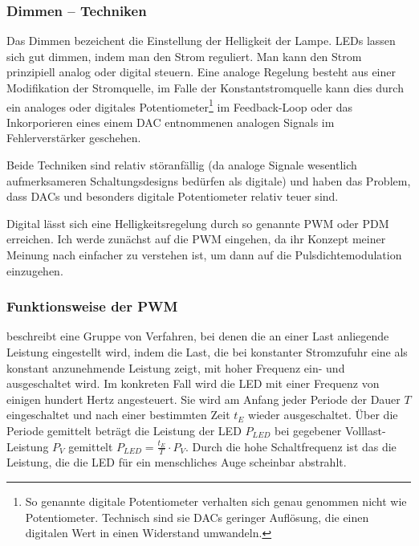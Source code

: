 \documentclass[12pt,a4paper,notitlepage]{article}
\begin{document}
\subsubsection{Dimmen -- Techniken}
Das Dimmen bezeichent die Einstellung der Helligkeit der Lampe. \glspl{LED} lassen sich gut dimmen, indem man den Strom reguliert. Man kann den Strom prinzipiell analog oder digital steuern. Eine analoge Regelung besteht aus einer Modifikation der Stromquelle, im Falle der Konstantstromquelle kann dies durch ein analoges oder digitales Potentiometer\footnote{So genannte digitale Potentiometer verhalten sich genau genommen nicht wie Potentiometer. Technisch sind sie \glspl{DAC} geringer Auflösung, die einen digitalen Wert in einen Widerstand umwandeln.} im Feedback-Loop oder das Inkorporieren eines einem \gls{DAC} entnommenen analogen Signals im Fehlerverstärker geschehen\cite{MAXIM23,MAXIM41,MAXIM42,ANALOG4,ANALOG5}.

Beide Techniken sind relativ störanfällig (da analoge Signale wesentlich aufmerksameren Schaltungsdesigns bedürfen als digitale) und haben das Problem, dass \glspl{DAC} und besonders digitale Potentiometer relativ teuer sind.

Digital lässt sich eine Helligkeitsregelung durch so genannte \gls{PWM} oder \gls{PDM} erreichen. Ich werde zunächst auf die \gls{PWM} eingehen, da ihr Konzept meiner Meinung nach einfacher zu verstehen ist, um dann auf die Pulsdichtemodulation einzugehen.

\subsubsection{Funktionsweise der PWM}
 beschreibt eine Gruppe von Verfahren, bei denen die an einer Last anliegende Leistung eingestellt wird, indem die Last, die bei konstanter Stromzufuhr eine als konstant anzunehmende Leistung zeigt, mit hoher Frequenz ein- und ausgeschaltet wird. Im konkreten Fall wird die \gls{LED} mit einer Frequenz von einigen hundert \gls{Hertz} angesteuert. Sie wird am Anfang jeder Periode der Dauer $T$ eingeschaltet und nach einer bestimmten Zeit $t_E$ wieder ausgeschaltet. Über die Periode gemittelt beträgt die Leistung der \gls{LED} $P_{LED}$ bei gegebener Volllast-Leistung $P_V$ gemittelt $P_{LED}=\frac{t_E}{T}\cdot P_{V}$. Durch die hohe Schaltfrequenz ist das die Leistung, die die \gls{LED} für ein menschliches Auge scheinbar abstrahlt.
\end{document}
